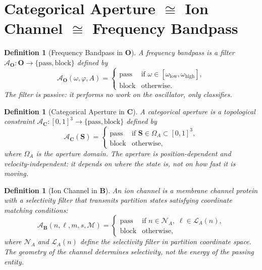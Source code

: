 \documentclass[twocolumn,10pt]{article}
\newtheorem{definition}[theorem]{Definition}
\theoremstyle{remark}
\newcommand{\Depth}{\mathcal{M}}
\newcommand{\Scoord}{\mathbf{S}}
\newcommand{\CatO}{\mathbf{O}}
\newcommand{\CatC}{\mathbf{C}}
\newcommand{\CatB}{\mathbf{B}}
\begin{document}
\section{\texorpdfstring{Categorical Aperture $\cong$ Ion Channel $\cong$ Frequency Bandpass}{Categorical Aperture = Ion Channel = Frequency Bandpass}}
\label{sec:aperture}

\begin{definition}[Frequency Bandpass in $\CatO$]
\label{def:aperture_O}
A \emph{frequency bandpass} is a filter $\mathcal{A}_\CatO: \CatO \to \{\mathrm{pass}, \mathrm{block}\}$ defined by
\begin{equation}
\mathcal{A}_\CatO(\omega,\varphi,A) = \begin{cases} \mathrm{pass} & \text{if } \omega \in [\omega_{\mathrm{low}}, \omega_{\mathrm{high}}], \\ \mathrm{block} & \text{otherwise}. \end{cases}
\label{eq:bandpass}
\end{equation}
The filter is \emph{passive}: it performs no work on the oscillator, only classifies.
\end{definition}

\begin{definition}[Categorical Aperture in $\CatC$]
\label{def:aperture_C}
A \emph{categorical aperture} is a topological constraint $\mathcal{A}_\CatC: [0,1]^3 \to \{\mathrm{pass}, \mathrm{block}\}$ defined by
\begin{equation}
\mathcal{A}_\CatC(\Scoord) = \begin{cases} \mathrm{pass} & \text{if } \Scoord \in \Omega_A \subset [0,1]^3, \\ \mathrm{block} & \text{otherwise}, \end{cases}
\label{eq:cat_aperture}
\end{equation}
where $\Omega_A$ is the aperture domain.
The aperture is \emph{position-dependent} and \emph{velocity-independent}: it depends on where the state is, not on how fast it is moving.
\end{definition}

\begin{definition}[Ion Channel in $\CatB$]
\label{def:aperture_B}
An \emph{ion channel} is a membrane channel protein with a selectivity filter \cite{hodgkin1952,gennis1989} that transmits partition states satisfying coordinate matching conditions:
\begin{equation}
\mathcal{A}_\CatB(n,\ell,m,s,\Depth) = \begin{cases} \mathrm{pass} & \text{if } n \in \mathcal{N}_A,\; \ell \in \mathcal{L}_A(n), \\ \mathrm{block} & \text{otherwise}, \end{cases}
\label{eq:ion_channel}
\end{equation}
where $\mathcal{N}_A$ and $\mathcal{L}_A(n)$ define the selectivity filter in partition coordinate space.
The geometry of the channel determines selectivity, not the energy of the passing entity.
\end{definition}
\end{document}
